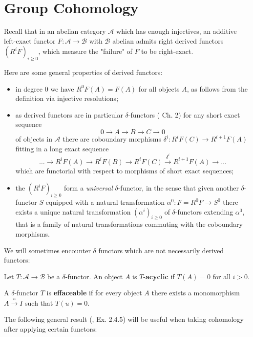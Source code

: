 \documentclass[a4paper, oneside]{memoir}
\begin{document}
\section{Group Cohomology}

Recall that in an abelian category $\mathcal{A}$ which has enough injectives, an additive left-exact functor $F:\mathcal{A}\to\mathcal{B}$ with $\mathcal{B}$ abelian admits right derived functors $(R^iF)_{i\geq 0}$, which measure the "failure" of $F$ to be right-exact.

\medskip \noindent Here are some general properties of derived functors:
\begin{itemize}
	\item in degree $0$ we have $R^0F(A)=F(A)$ for all objects $A$, as follows from the definition via injective resolutions;
	\item as derived functors are in particular $\delta$-functors (\cite{Weibel} Ch. 2)
	      for any short exact sequence
	      \[
		      0\to A\to B\to C\to 0
	      \]
	      of objects in $\mathcal{A}$ there are coboundary morphisms $\delta^i:R^iF(C)\to R^{i+1}F(A)$ fitting in a long exact sequence
	      \[
		      \ldots\to R^iF(A)\to R^iF(B)\to R^iF(C)\overset{\delta^i}{\to} R^{i+1}F(A)\to\ldots
	      \]
	      which are functorial with respect to morphisms of short exact sequences;
	\item the $(R^iF)_{i \geq 0}$ form a \textit{universal} $\delta$-functor, in the sense that given another $\delta$-functor $S$ equipped with a natural transformation $\alpha^0:F=R^0F\to S^0$ there exists a unique natural transformation $(\alpha^i)_{i\geq 0}$ of $\delta$-functors extending $\alpha^0$, that is a family of natural transformations commuting with the coboundary morphisms.
\end{itemize}

We will sometimes encounter $\delta$ functors which are not necessarily derived functors:
\begin{definition}
	Let $T:\mathcal{A}\to\mathcal{B}$ be a $\delta$-functor. An object $A$ is $T$-\textbf{acyclic} if $T(A)=0$ for all $i>0$.
\end{definition}

\begin{definition}
	A $\delta$-functor $T$ is \textbf{effaceable} if for every object $A$ there exists a monomorphism $A\overset{u}{\to} I$ such that $T(u)=0$.
\end{definition}

The following general result (\cite{Tohoku}, Ex. 2.4.5) will be useful when taking cohomology after applying certain functors:
\end{document}
